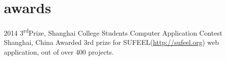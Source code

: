 \documentclass[]{friggeri-cv} %
\begin{document}

\section{awards}

\begin{entrylist}
\entry
{2014}
{3\textsuperscript{rd}Prize, Shanghai College Students Computer Application Contest}
{Shanghai, China}
{Awarded 3rd prize for SUFEEL(\url{http://sufeel.org}) web application, out of over 400 projects.}
\end{entrylist}
\end{document}
